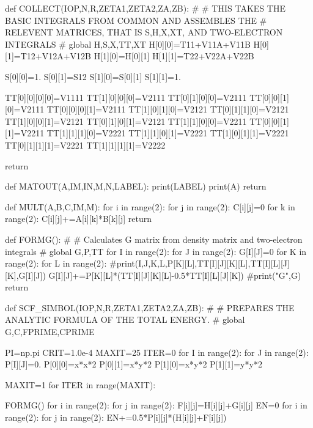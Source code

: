     

def COLLECT(IOP,N,R,ZETA1,ZETA2,ZA,ZB):
#
# THIS TAKES THE BASIC INTEGRALS FROM COMMON AND ASSEMBLES THE
# RELEVENT MATRICES, THAT IS S,H,X,XT, AND TWO-ELECTRON INTEGRALS
#
    global H,S,X,TT,XT
    H[0][0]=T11+V11A+V11B
    H[0][1]=T12+V12A+V12B
    H[1][0]=H[0][1]
    H[1][1]=T22+V22A+V22B

    S[0][0]=1.
    S[0][1]=S12
    S[1][0]=S[0][1]
    S[1][1]=1.


    TT[0][0][0][0]=V1111
    TT[1][0][0][0]=V2111
    TT[0][1][0][0]=V2111
    TT[0][0][1][0]=V2111
    TT[0][0][0][1]=V2111
    TT[1][0][1][0]=V2121
    TT[0][1][1][0]=V2121
    TT[1][0][0][1]=V2121
    TT[0][1][0][1]=V2121
    TT[1][1][0][0]=V2211
    TT[0][0][1][1]=V2211
    TT[1][1][1][0]=V2221
    TT[1][1][0][1]=V2221
    TT[1][0][1][1]=V2221
    TT[0][1][1][1]=V2221
    TT[1][1][1][1]=V2222


    return

def MATOUT(A,IM,IN,M,N,LABEL):
    print(LABEL)
    print(A)
    return

def MULT(A,B,C,IM,M):
    for i in range(2):
        for j in range(2):
            C[i][j]=0
            for k in range(2):
                C[i][j]+=A[i][k]*B[k][j]
    return 

def FORMG():
#
# Calculates G matrix from density matrix and two-electron integrals
#
    global G,P,TT
    for I in range(2):
        for J in range(2):
            G[I][J]=0
            for K in range(2):
                for L in range(2):
                    #print(I,J,K,L,P[K][L],TT[I][J][K][L],TT[I][L][J][K],G[I][J])
                    G[I][J]+=P[K][L]*(TT[I][J][K][L]-0.5*TT[I][L][J][K])
    #print("G",G)
    return 



def SCF_SIMBOL(IOP,N,R,ZETA1,ZETA2,ZA,ZB):
#
# PREPARES THE ANALYTIC FORMULA OF THE TOTAL ENERGY.
#
    global G,C,FPRIME,CPRIME

    PI=np.pi
    CRIT=1.0e-4
    MAXIT=25
    ITER=0
    for I in range(2):
        for J in range(2):
            P[I][J]=0.
    P[0][0]=x*x*2
    P[0][1]=x*y*2
    P[1][0]=x*y*2
    P[1][1]=y*y*2
    
    MAXIT=1
    for ITER in range(MAXIT):
        
        FORMG()
        for i in range(2):
            for j in range(2):
                F[i][j]=H[i][j]+G[i][j]
        EN=0
        for i in range(2):
            for j in range(2):
                EN+=0.5*P[i][j]*(H[i][j]+F[i][j])

